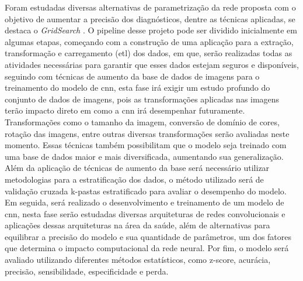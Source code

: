 Foram estudadas diversas alternativas de parametrização da rede proposta com o objetivo de aumentar a precisão dos diagnósticos, dentre as técnicas aplicadas, se destaca o \textit{GridSearch} . O pipeline desse projeto pode ser dividido inicialmente em algumas etapas, começando com a construção de uma aplicação para a extração, transformação e carregamento (\gls{etl}) dos dados, em que, serão realizadas todas as atividades necessárias para garantir que esses dados estejam seguros e disponíveis, seguindo com técnicas de aumento da base de dados de imagens para o treinamento do modelo de \gls{cnn}, esta fase irá exigir um estudo profundo do conjunto de dados de imagens, pois as transformações aplicadas nas imagens terão impacto direto em como a \gls{cnn} irá desempenhar futuramente. Transformações como o tamanho da imagem, conversão de domínio de cores, rotação das imagens, entre outras diversas transformações serão avaliadas neste momento. Essas técnicas também possibilitam que o modelo seja treinado com uma base de dados maior e mais diversificada, aumentando sua generalização. Além da aplicação de técnicas de aumento da base será necessário utilizar metodologias para a estratificação dos dados, o método utilizado será de validação cruzada k-pastas estratificado para avaliar o desempenho do modelo. Em seguida, será realizado o desenvolvimento e treinamento de um modelo de \gls{cnn}, nesta fase serão estudadas diversas arquiteturas de redes convolucionais e aplicações dessas arquiteturas na área da saúde, além de alternativas para equilibrar a precisão do modelo e sua quantidade de parâmetros, um dos fatores que determina o impacto computacional da rede neural. Por fim, o modelo será avaliado utilizando diferentes métodos estatísticos, como z-score, acurácia, precisão, sensibilidade, especificidade e perda.

